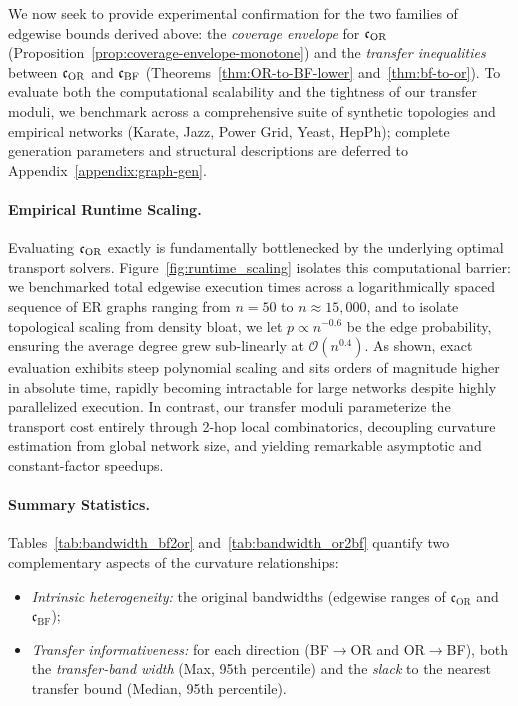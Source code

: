 \documentclass[twoside,11pt]{article}
\numberwithin{equation}{section}
\numberwithin{theorem}{section}
\numberwithin{example}{section}
\begin{document}
We now seek to provide experimental confirmation for the two families of edgewise bounds derived above: the \emph{coverage envelope} for $\mathfrak c_{\rm OR}$ (Proposition~\ref{prop:coverage-envelope-monotone}) and the \emph{transfer inequalities} between $\mathfrak c_{\rm OR}$ and $\mathfrak c_{\rm BF}$ (Theorems~\ref{thm:OR-to-BF-lower} and~\ref{thm:bf-to-or}). To evaluate both the computational scalability and the tightness of our transfer moduli, we benchmark across a comprehensive suite of synthetic topologies and empirical networks (Karate, Jazz, Power Grid, Yeast, HepPh); complete generation parameters and structural descriptions are deferred to Appendix~\ref{appendix:graph-gen}.

\paragraph{Empirical Runtime Scaling.}

Evaluating $\mathfrak c_{\rm OR}$ exactly is fundamentally bottlenecked by the underlying optimal transport solvers. Figure~\ref{fig:runtime_scaling} isolates this computational barrier: we benchmarked total edgewise execution times across a logarithmically spaced sequence of ER graphs ranging from $n=50$ to $n\approx15{,}000$, and to isolate topological scaling from density bloat, we let $p \propto n^{-0.6}$ be the edge probability, ensuring the average degree grew sub-linearly at $\mathcal{O}(n^{0.4})$. As shown, exact evaluation exhibits steep polynomial scaling and sits orders of magnitude higher in absolute time, rapidly becoming intractable for large networks despite highly parallelized execution. In contrast, our transfer moduli parameterize the transport cost entirely through 2-hop local combinatorics, decoupling curvature estimation from global network size, and yielding remarkable asymptotic and constant-factor speedups.


\paragraph{Summary Statistics.}
Tables~\ref{tab:bandwidth_bf2or} and~\ref{tab:bandwidth_or2bf} quantify two complementary aspects of the curvature relationships:
\begin{itemize}
    \item[(i)] \emph{Intrinsic heterogeneity:} the original bandwidths (edgewise ranges of $\mathfrak c_{\mathrm{OR}}$ and $\mathfrak c_{\mathrm{BF}}$);
    \item[(ii)] \emph{Transfer informativeness:} for each direction (BF$\!\to$OR and OR$\!\to$BF), both the \emph{transfer-band width} (Max, 95th percentile) and the \emph{slack} to the nearest transfer bound (Median, 95th percentile).
\end{itemize}
\end{document}
